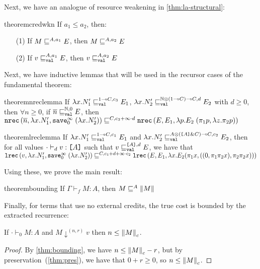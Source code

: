 Next, we have an analogue of resource weakening in
\autoref{thm:la-structural}:

\begin{restatable}{theorem}{credwkn}
If $a_1 \leq a_2$, then:
\begin{enumerate}
  \item[(1)] If $M \sqsubseteq^{A,a_1} E$, then $M \sqsubseteq^{A,a_2} E$
  \item[(2)] If $v \sqsubseteq_{\texttt{val}}^{A,a_1} E$, then $v \sqsubseteq_{\texttt{val}}^{A,a_2} E$ 
\end{enumerate}
\end{restatable}

Next, we have inductive lemmas that will be used in the recursor cases
of the fundamental theorem:

\begin{restatable}[$\N$-Recursor]{theorem}{nreclemma}
\label{thm:nrec-lemma}
If $\lambda x.N_1' \sqsubseteq_{\texttt{val}}^{1 \multimap C,c_3} E_1$, $\lambda x.N_2' \sqsubseteq_{\texttt{val}}^{\mathbb{N}
\otimes (1 \multimap C) \multimap C,d} E_2$ with $d \geq 0$, then $\forall n \geq 0$, if $\overline n \sqsubseteq_{\texttt{val}}^{\mathbb{N},0} E$, then $\texttt{nrec}\left(\overline n,\lambda x.N_1',\texttt{save}^{\infty}_{0} \; (\lambda x.N_2')\right) \sqsubseteq^{C,c_3 + \infty \cdot d} \texttt{nrec}\left(E,E_1,\lambda p. E_2 \; (\pi_1 p, \lambda z.\pi_2 p)\right)$
\end{restatable}

\begin{restatable}{theorem}{lreclemma}
\label{thm:lrec-lemma}
If $\lambda x.N_1' \sqsubseteq_{\texttt{val}}^{1 \multimap C,c_1} E_1$ and $\lambda x.N_2'
\sqsubseteq_{\texttt{val}}^{A \otimes (\texttt{[}A\texttt{]} \& C) \multimap C,c_2} E_2$, then for all
values $\cdot \vdash_d v : \texttt{[}A\texttt{]}$ such that $v \sqsubseteq_{\texttt{val}}^{\texttt{[}A\texttt{]},d}
E$, we have that\\
$\texttt{lrec}\left(v,\lambda x.N_1',\texttt{save}^{\infty}_{0} \; (\lambda x.N_2')\right) \sqsubseteq^{C,c_1+d + \infty \cdot c_2} \texttt{lrec}\left(E,E_1,\lambda x. E_2 (\pi_1 x,((0,\pi_1 \pi_2 x),\pi_2\pi_2 x)) \right)$
\end{restatable}

Using these, we prove the main result:

\begin{restatable}{theorem}{bounding}
\label{thm:bounding}
If $\Gamma \vdash_f M : A$, then $M \sqsubseteq^A \left\lVert M\right\rVert$
\end{restatable}

Finally, for terms that use no external credits, the true cost is
bounded by the extracted recurrence: 

\begin{corollary} \label{cor:true-cost}
If $\cdot \vdash_0 M : A$ and $M \downarrow^{(n,r)} v$ then $n \le
\left\lVert M\right\rVert_c$.
\end{corollary}
\begin{proof}
By \autoref{thm:bounding}, we have $n \le \left\lVert M\right\rVert_c - r$, but by
preservation~(\autoref{thm:pres}), we have that $0 + r \ge 0$, so
$n \le \left\lVert M\right\rVert_c$.  
\end{proof}

